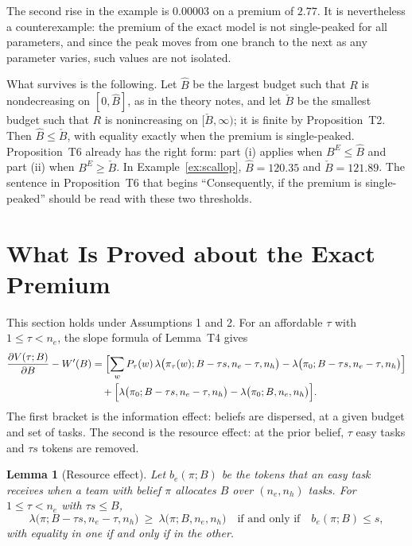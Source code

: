 \documentclass[11pt]{article}
\newtheorem{lemma}{Lemma}
\theoremstyle{definition}
\begin{document}
The second rise in the example is $0.00003$ on a premium of $2.77$. It is nevertheless a counterexample: the premium of the exact model is not single-peaked for all parameters, and since the peak moves from one branch to the next as any parameter varies, such values are not isolated.

What survives is the following. Let $\hat B$ be the largest budget such that $R$ is nondecreasing on $[0,\hat B]$, as in the theory notes, and let $\check B$ be the smallest budget such that $R$ is nonincreasing on $[\check B,\infty)$; it is finite by Proposition~T2. Then $\hat B\le\check B$, with equality exactly when the premium is single-peaked. Proposition~T6 already has the right form: part (i) applies when $B^E\le\hat B$ and part (ii) when $B^E\ge\check B$. In Example~\ref{ex:scallop}, $\hat B=120.35$ and $\check B=121.89$. The sentence in Proposition~T6 that begins ``Consequently, if the premium is single-peaked'' should be read with these two thresholds.

\section{What Is Proved about the Exact Premium}

This section holds under Assumptions 1 and 2. For an affordable $\tau$ with $1\le\tau<n_e$, the slope formula of Lemma~T4 gives
\begin{align}
\frac{\partial V(\tau;B)}{\partial B}-W'(B)
&=\Bigl[\sum_wP_\tau(w)\,\lambda\bigl(\pi_\tau(w);B-\tau s,n_e-\tau,n_h\bigr)-\lambda\bigl(\pi_0;B-\tau s,n_e-\tau,n_h\bigr)\Bigr]\notag\\
&\quad+\Bigl[\lambda\bigl(\pi_0;B-\tau s,n_e-\tau,n_h\bigr)-\lambda\bigl(\pi_0;B,n_e,n_h\bigr)\Bigr].\label{eq:two}
\end{align}
The first bracket is the information effect: beliefs are dispersed, at a given budget and set of tasks. The second is the resource effect: at the prior belief, $\tau$ easy tasks and $\tau s$ tokens are removed.

\begin{lemma}[Resource effect]\label{lem:resource}
Let $b_e(\pi;B)$ be the tokens that an easy task receives when a team with belief $\pi$ allocates $B$ over $(n_e,n_h)$ tasks. For $1\le\tau<n_e$ with $\tau s\le B$,
\[
\lambda\bigl(\pi;B-\tau s,n_e-\tau,n_h\bigr)\ \ge\ \lambda\bigl(\pi;B,n_e,n_h\bigr)\quad\text{if and only if}\quad b_e(\pi;B)\le s,
\]
with equality in one if and only if in the other.
\end{lemma}
\end{document}

